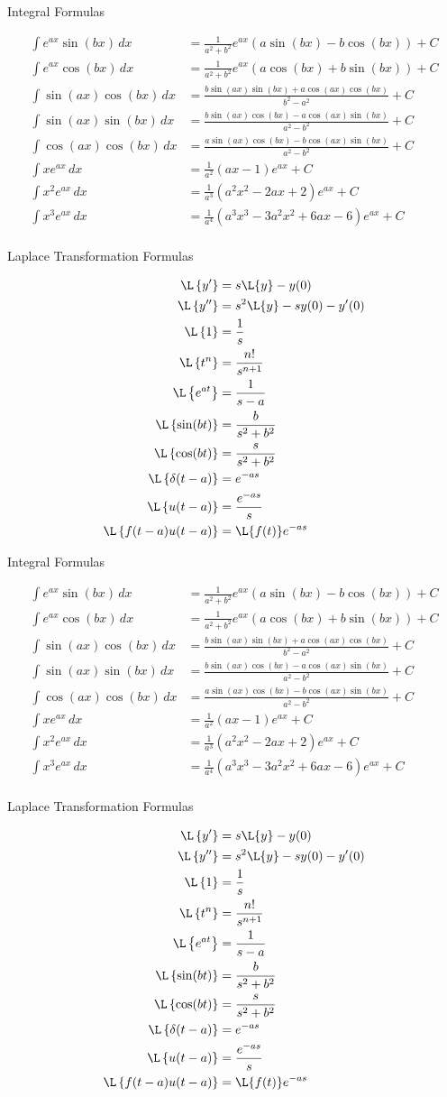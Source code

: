 \documentclass{article}
\newcommand{\tablePage}{
\begin{center}\Huge Integral Formulas\end{center}
\begin{align*}
\int e^{ax}\sin(bx) \,dx &= \frac{1}{a^2+b^2} e^{a x} \left(a \sin(bx) - b\cos(bx)\right)+C \\
\int e^{ax}\cos(bx) \,dx &= \frac{1}{a^2+b^2} e^{a x} \left(a \cos(bx) + b\sin(bx)\right)+C \\
\int \sin(a x) \cos(b x) \,dx &= \frac{b \sin(a x) \sin(b x) + a \cos(a x) \cos(b x)}{b^2 - a^2} + C \\
\int \sin(a x) \sin(b x) \,dx &= \frac{b \sin(a x) \cos(b x) - a \cos(a x) \sin(b x)}{a^2 - b^2} + C \\
\int  \cos(a x) \cos(b x) \,dx &= \frac{a \sin(a x) \cos(b x) - b \cos(a x) \sin(b x)}{a^2 - b^2} + C \\
\int xe^{ax} \,dx &= \frac{1}{a^2}(ax-1)e^{ax}+C \\
\int x^2e^{ax} \,dx &= \frac{1}{a^3}(a^2x^2-2ax+2)e^{ax}+C \\
\int x^3e^{ax} \,dx &= \frac{1}{a^4}(a^3x^3-3a^2x^2+6ax-6)e^{ax}+C \\
\end{align*}

\vfill

\begin{center}\Huge Laplace Transformation Formulas\end{center}
\begin{align*}
\L\left\{y'\right\} &= s\L\{y\}-y(0) \\
\L\left\{y''\right\} &= s^2\L\{y\}-sy(0)-y'(0) \\
\L\left\{1\right\} &= \frac{1}{s} \\
\L\left\{t^n\right\} &= \frac{n!}{s^{n+1}} \\
\L\left\{e^{at}\right\} &= \frac{1}{s-a} \\
\L\left\{ \sin(bt) \right\} &= \frac{b}{s^2+b^2}  \\ 
\L\left\{ \cos(bt) \right\} &= \frac{s}{s^2+b^2}\\ 
\L\left\{ \delta(t-a) \right\} &= e^{-as}  \\ 
\L\left\{ u(t-a)\right\} &= \frac{e^{-as}}{s} \\ 
\L\left\{ f(t-a)u(t-a)\right\} &= \L\{f(t)\}e^{-as}  \\ 
\end{align*}
}
\begin{document}
\large
\tablePage

\newpage

\tablePage
\end{document}
